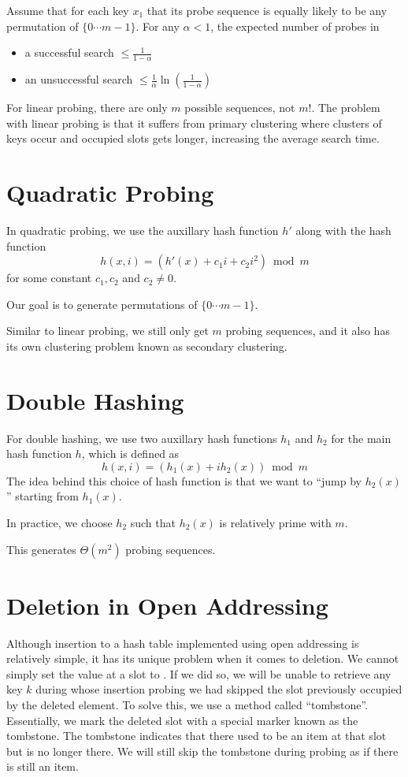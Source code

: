 \begin{theorem}
    Assume that for each key $x_1$ that its probe sequence is equally likely to be any permutation of $\{0\cdots m-1\}$. For any $\alpha<1$, the expected number of probes in
    \begin{itemize}
        \item a successful search $\leq \frac{1}{1-\alpha}$
        \item an unsuccessful search $\leq \frac{1}{\alpha} \ln\left( \frac{1}{1-\alpha} \right) $  
    \end{itemize}
\end{theorem}

For linear probing, there are only $m$ possible sequences, not $m!$. The problem with linear probing is that it suffers from primary clustering where clusters of keys occur and occupied slots gets longer, increasing the average search time.

\section{Quadratic Probing}

In quadratic probing, we use the auxillary hash function $h'$ along with the hash function
$$
h(x,i) = (h'(x) + c_1i + c_2i^2) \bmod m
$$
for some constant $c_1,c_2$ and $c_2 \neq 0$.

Our goal is to generate permutations of $\{0\cdots m-1\}$. 

Similar to linear probing, we still only get $m$ probing sequences, and it also has its own clustering problem known as secondary clustering.

\section{Double Hashing}

For double hashing, we use two auxillary hash functions $h_1$ and $h_2$ for the main hash function $h$, which is defined as
$$
h(x,i) = (h_1(x) + ih_2(x)) \bmod m
$$
The idea behind this choice of hash function is that we want to ``jump by $h_2(x)$'' starting from $h_1(x)$.

In practice, we choose $h_2$ such that $h_2(x)$ is relatively prime with $m$.

This generates $\Theta(m^2)$ probing sequences.

\section{Deletion in Open Addressing}

Although insertion to a hash table implemented using open addressing is relatively simple, it has its unique problem when it comes to deletion. We cannot simply set the value at a slot to . If we did so, we will be unable to retrieve any key $k$ during whose insertion probing we had skipped the slot previously occupied by the deleted element. To solve this, we use a method called ``tombstone''. Essentially, we mark the deleted slot with a special marker  known as the tombstone. The tombstone indicates that there used to be an item at that slot but is no longer there. We will still skip the tombstone during probing as if there is still an item.